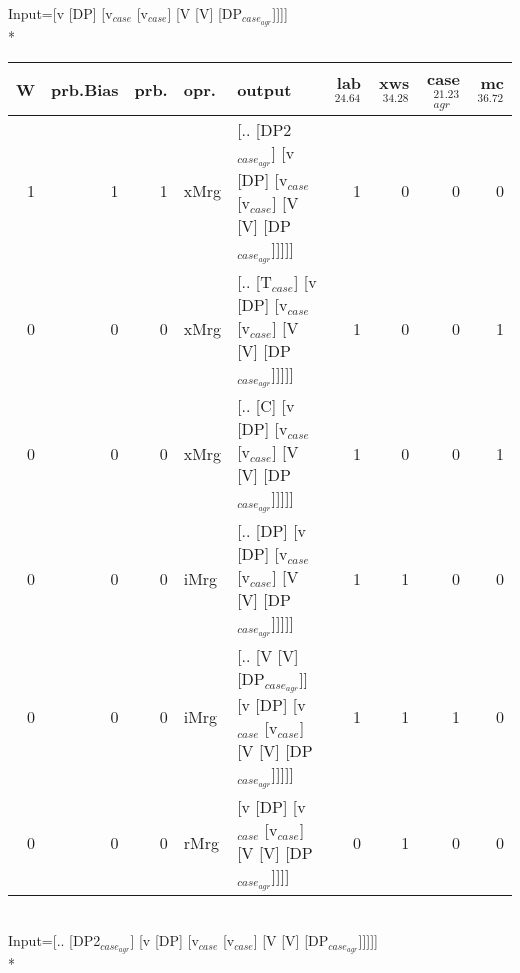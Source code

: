 \begingroup\scriptsize Input=[v [DP] [v$_{case}$ [v$_{case}$] [V [V] [DP$_{case_{agr}}$]]]]\\*
\begin{tabularx}{\linewidth}{rrrlXrrrr}
\hline
   W &   prb.Bias &   prb. & opr.   & output                                                                      &   lab$^{24.64}$ &   xws$^{34.28}$ &   case$_{agr}^{21.23}$ &   mc$^{36.72}$ \\
\hline
   1 &       1 &   1 & xMrg & [.. [DP2$_{case_{agr}}$] [v [DP] [v$_{case}$ [v$_{case}$] [V [V] [DP$_{case_{agr}}$]]]]]        &             1 &             0 &                  0 &            0 \\
   0 &       0 &   0 & xMrg & [.. [T$_{case}$] [v [DP] [v$_{case}$ [v$_{case}$] [V [V] [DP$_{case_{agr}}$]]]]]              &             1 &             0 &                  0 &            1 \\
   0 &       0 &   0 & xMrg & [.. [C] [v [DP] [v$_{case}$ [v$_{case}$] [V [V] [DP$_{case_{agr}}$]]]]]                   &             1 &             0 &                  0 &            1 \\
   0 &       0 &   0 & iMrg & [.. [DP] [v [DP] [v$_{case}$ [v$_{case}$] [V [V] [DP$_{case_{agr}}$]]]]]                  &             1 &             1 &                  0 &            0 \\
   0 &       0 &   0 & iMrg & [.. [V [V] [DP$_{case_{agr}}$]] [v [DP] [v$_{case}$ [v$_{case}$] [V [V] [DP$_{case_{agr}}$]]]]] &             1 &             1 &                  1 &            0 \\
   0 &       0 &   0 & rMrg & [v [DP] [v$_{case}$ [v$_{case}$] [V [V] [DP$_{case_{agr}}$]]]]                            &             0 &             1 &                  0 &            0 \\
\hline
\end{tabularx}\endgroup\\
\begingroup\scriptsize Input=[.. [DP2$_{case_{agr}}$] [v [DP] [v$_{case}$ [v$_{case}$] [V [V] [DP$_{case_{agr}}$]]]]]\\*
